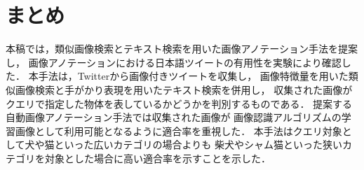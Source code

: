 \documentclass{deimj}
\begin{document}
\section{まとめ}
\label{sec:format}
本稿では，類似画像検索とテキスト検索を用いた画像アノテーション手法を提案し，
画像アノテーションにおける日本語ツイートの有用性を実験により確認した．
本手法は，Twitterから画像付きツイートを収集し，
画像特徴量を用いた類似画像検索と手がかり表現を用いたテキスト検索を併用し，
収集された画像がクエリで指定した物体を表しているかどうかを判別するものである．
提案する自動画像アノテーション手法では収集された画像が
画像認識アルゴリズムの学習画像として利用可能となるように適合率を重視した．
本手法はクエリ対象として犬や猫といった広いカテゴリの場合よりも
柴犬やシャム猫といった狭いカテゴリを対象とした場合に高い適合率を示すことを示した．
\vspace{2em}



\end{document}
